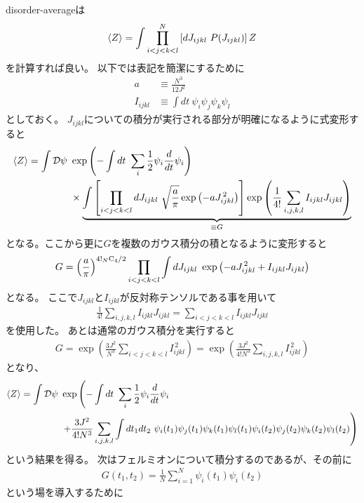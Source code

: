 	disorder-averageは
	\begin{align}
	\average{Z} = \int \prod_{i<j<k<l}^{N}\left[dJ_{ijkl}\ P(J_{ijkl})\right]Z
	\end{align}
	を計算すれば良い。
	以下では表記を簡潔にするために
	\begin{align}
	a &\equiv \frac{N^3}{12J^2}\\
	I_{ijkl} &\equiv \int dt\ \psi_i\psi_j\psi_k\psi_l
	\end{align}
	としておく。
	$J_{ijkl}$についての積分が実行される部分が明確になるように式変形すると
	\begin{align}
	\langle Z \rangle =
		\int \mathcal{D}\psi \  &\exp\left(- \int dt\ \sum_i \frac{1}{2}\psi_i\frac{d}{dt}\psi_i\right)
		\nonumber\\
		&\times \underbrace{\int \left[\prod_{i<j<k<l}
			dJ_{ijkl}\ \sqrt{\frac{a}{\pi}} \exp\left(-aJ_{ijkl}^{\, 2}\right)
			\right]
			\exp\left(\frac{1}{4!}\sum_{i,j,k,l}I_{ijkl}J_{ijkl}\right)}_{\equiv G}
	\end{align}
	となる。ここから更に$G$を複数のガウス積分の積となるように変形すると
	\begin{align}
	G = \left(\frac{a}{\pi}\right)^{4!{}_{N} \mathrm{C}_{4} / 2}
		\prod_{i<j<k<l}\int dJ_{ijkl}\ \exp\left(
		-aJ_{ijkl}^{\, 2} + I_{ijkl}J_{ijkl}
		\right)
	\end{align}
	となる。
	ここで$J_{ijkl}$と$I_{ijkl}$が反対称テンソルである事を用いて
	\begin{align}
	\frac{1}{4!}\sum_{i,j,k,l}I_{ijkl}J_{ijkl} = \sum_{i<j<k<l}I_{ijkl}J_{ijkl}
	\end{align}
	を使用した。
	あとは通常のガウス積分を実行すると
	\begin{align}
	G = \exp\left(\frac{3J^2}{N^3}\sum_{i<j<k<l}I_{ijkl}^{\, 2}\right)
	  = \exp\left(\frac{3J^2}{4!N^3}\sum_{i,j,k,l}I_{ijkl}^{\, 2}\right)
	\end{align}
	となり、
	\begin{align}
	\langle Z \rangle = \int \mathcal{D}\psi \  &\exp\left(
	- \int dt\ \sum_i \frac{1}{2}\psi_i\frac{d}{dt}\psi_i \right. \nonumber\\
	&\left.
	+ \frac{3J^2}{4!N^3}\sum_{i,j,k,l}\int dt_1dt_2\
		\psi_i(t_1)\psi_j(t_1)\psi_k(t_1)\psi_l(t_1)
		\psi_i(t_2)\psi_j(t_2)\psi_k(t_2)\psi_l(t_2)
	\right)
	\end{align}
	という結果を得る。
	次はフェルミオンについて積分するのであるが、その前に
	\begin{align}
	G(t_1, t_2) = \frac{1}{N}\sum_{i = 1}^{N}\psi_i(t_1)\psi_i(t_2)
	\end{align}
	という場を導入するために
